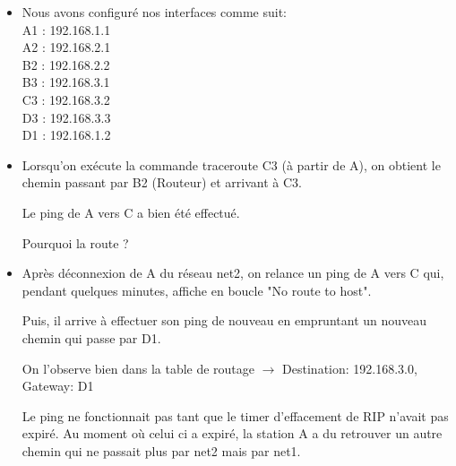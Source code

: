 \documentclass{article}
\begin{document}
\begin{itemize}\renewcommand{\labelitemi}{$\bullet$}
\item Nous avons configuré nos interfaces comme suit:\\

A1 : 192.168.1.1\\

A2 : 192.168.2.1\\

B2 : 192.168.2.2\\

B3 : 192.168.3.1\\

C3 : 192.168.3.2\\

D3 : 192.168.3.3\\

D1 : 192.168.1.2\\

\item Lorsqu'on exécute la commande traceroute C3 (à partir de A), on obtient le chemin passant par B2 (Routeur) et arrivant à C3.

Le ping de A vers C a bien été effectué.

Pourquoi la route ?

\item Après déconnexion de A du réseau net2, on relance un ping de A vers C qui, pendant quelques minutes, affiche en boucle "No route to host".

Puis, il arrive à effectuer son ping de nouveau en empruntant un nouveau chemin qui passe par D1. 

On l'observe bien dans la table de routage $\rightarrow$ Destination: 192.168.3.0, Gateway: D1

Le ping ne fonctionnait pas tant que le timer d'effacement de RIP n'avait pas expiré. Au moment où celui ci a expiré, la station A a du retrouver un autre chemin qui ne passait plus par net2 mais par net1.\\
\end{itemize}
\end{document}
